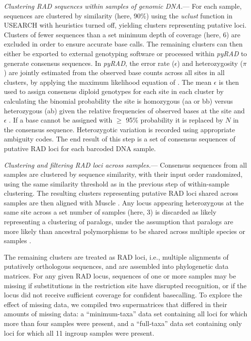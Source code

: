 \documentclass[12pt,letterpaper]{article}
\renewcommand{\subsubsection}[1]{%
\vspace{2ex}
\noindent
\textit{#1.}---}
\begin{document}
\subsubsection{Clustering RAD sequences within samples of genomic
  DNA}
For each sample, sequences are clustered by similarity (here, 90\%)
using the \emph{uclust} function in USEARCH \citep{edgar_search_2010}
with heuristics turned off, yielding clusters representing putative
loci.  Clusters of fewer sequences than a set minimum depth of
coverage (here, 6) are excluded in order to ensure accurate base
calls.  The remaining clusters can then either be exported to external
genotyping software or processed within \emph{pyRAD} to generate
consensus sequences.  In \emph{pyRAD}, the error rate ($\epsilon$) and
heterozygosity ($\pi$) are jointly estimated from the observed base
counts across all sites in all clusters, by applying the maximum
likelihood equation of \cite{lynch_estimation_2008}. The mean
$\epsilon$ is then used to assign consensus diploid genotypes for each
site in each cluster by calculating the binomial probability the site
is homozygous (aa or bb) versus heterozygous (ab) given the relative
frequencies of observed bases at the site and $\epsilon$
\citep{li_mapping_2008}. If a base cannot be assigned with $\ge$ 95\%
probability it is replaced by $N$ in the consensus
sequence. Heterozygotic variation is recorded using appropriate
ambiguity codes. The end result of this step is a set of consensus
sequences of putative RAD loci for each barcoded DNA sample.

\subsubsection{Clustering and filtering RAD loci across samples}
Consensus sequences from all samples are clustered by sequence
similarity, with their input order randomized, using the same
similarity threshold as in the previous step of within-sample
clustering. The resulting clusters representing putative RAD loci
shared across samples are then aligned with Muscle
\citep{edgar_muscle:_2004}. Any locus appearing heterozygous at the
same site across a set number of samples (here, 3) is discarded as
likely representing a clustering of paralogs, under the assumption
that paralogs are more likely than ancestral polymorphisms to be
shared across multiple species or samples
\citep{hohenlohe_nextgeneration_2011}.

The remaining clusters are treated as RAD loci, i.e., multiple
alignments of putatively orthologous sequences, and are assembled into
phylogenetic data matrices. For any given RAD locus, sequences of one
or more samples may be missing if substitutions in the restriction
site have disrupted recognition, or if the locus did not receive
sufficient coverage for confident basecalling. To explore the effect
of missing data, we compiled two supermatrices that differed in their
amounts of missing data: a ``minimum-taxa'' data set containing all
loci for which more than four samples were present, and a
``full-taxa'' data set containing only loci for which all 11 ingroup
samples were present.
\end{document}
